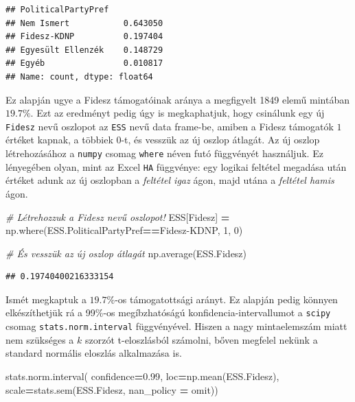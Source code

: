 \documentclass[
]{book}
\newenvironment{Shaded}{\begin{snugshade}}{\end{snugshade}}
\newcommand{\CommentTok}[1]{\textcolor[rgb]{0.56,0.35,0.01}{\textit{#1}}}
\newcommand{\DecValTok}[1]{\textcolor[rgb]{0.00,0.00,0.81}{#1}}
\newcommand{\FloatTok}[1]{\textcolor[rgb]{0.00,0.00,0.81}{#1}}
\newcommand{\NormalTok}[1]{#1}
\newcommand{\OperatorTok}[1]{\textcolor[rgb]{0.81,0.36,0.00}{\textbf{#1}}}
\newcommand{\StringTok}[1]{\textcolor[rgb]{0.31,0.60,0.02}{#1}}
\begin{document}
\begin{verbatim}
## PoliticalPartyPref
## Nem Ismert           0.643050
## Fidesz-KDNP          0.197404
## Egyesült Ellenzék    0.148729
## Egyéb                0.010817
## Name: count, dtype: float64
\end{verbatim}

Ez alapján ugye a Fidesz támogatóinak aránya a megfigyelt 1849 elemű mintában \(19.7\%\). Ezt az eredményt pedig úgy is megkaphatjuk, hogy csinálunk egy új \texttt{Fidesz} nevű oszlopot az \texttt{ESS} nevű data frame-be, amiben a Fidesz támogatók \(1\) értéket kapnak, a többiek \(0\)-t, és vesszük az új oszlop átlagát.
Az új oszlop létrehozásához a \texttt{numpy} csomag \texttt{where} néven futó függvényét használjuk. Ez lényegében olyan, mint az Excel \texttt{HA} függvénye: egy logikai feltétel megadása után értéket adunk az új oszlopban a \emph{feltétel igaz} ágon, majd utána a \emph{feltétel hamis} ágon.

\begin{Shaded}
\begin{Highlighting}[]
\CommentTok{\# Létrehozzuk a Fidesz nevű oszlopot!}
\NormalTok{ESS[}\StringTok{\textquotesingle{}Fidesz\textquotesingle{}}\NormalTok{] }\OperatorTok{=}\NormalTok{ np.where(ESS.PoliticalPartyPref}\OperatorTok{==}\StringTok{\textquotesingle{}Fidesz{-}KDNP\textquotesingle{}}\NormalTok{, }\DecValTok{1}\NormalTok{, }\DecValTok{0}\NormalTok{)}

\CommentTok{\# És vesszük az új oszlop átlagát}
\NormalTok{np.average(ESS.Fidesz)}
\end{Highlighting}
\end{Shaded}

\begin{verbatim}
## 0.19740400216333154
\end{verbatim}

Ismét megkaptuk a \(19.7\%\)-os támogatottsági arányt. Ez alapján pedig könnyen elkészíthetjük rá a 99\%-os megíbzhatóságú konfidencia-intervallumot a \texttt{scipy} csomag \texttt{stats.norm.interval} függvényével. Hiszen a nagy mintaelemszám miatt nem szükséges a \(k\) szorzót t-eloszlásból számolni, bőven megfelel nekünk a standard normális eloszlás alkalmazása is.

\begin{Shaded}
\begin{Highlighting}[]
\NormalTok{stats.norm.interval(}
\NormalTok{  confidence}\OperatorTok{=}\FloatTok{0.99}\NormalTok{,}
\NormalTok{  loc}\OperatorTok{=}\NormalTok{np.mean(ESS.Fidesz),}
\NormalTok{  scale}\OperatorTok{=}\NormalTok{stats.sem(ESS.Fidesz, nan\_policy }\OperatorTok{=} \StringTok{\textquotesingle{}omit\textquotesingle{}}\NormalTok{))}
\end{Highlighting}
\end{Shaded}
\end{document}
